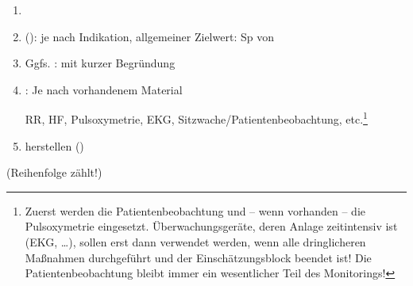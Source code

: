 \label{m:standardmassnahmen-vital}
\label{topic:standardmassnahmen-vital}%
\begin{enumerate}
  \item {}
  \item {}
  (): je nach Indikation,
  allgemeiner Zielwert: Sp von \PC*
  \item Ggfs.  :
  mit kurzer Begründung
  
  \item {}: Je nach
  vorhandenem Material
  
  RR, HF, Pulsoxymetrie, EKG,
  Sitzwache/Patientenbeobachtung, etc.\footnote{Zuerst werden die Patientenbeobachtung
  und -- wenn vorhanden -- die
  Pulsoxymetrie eingesetzt. Überwachungsgeräte, deren Anlage
  zeitintensiv ist (EKG, \ldots), sollen erst dann verwendet
  werden, wenn alle dringlicheren Maßnahmen durchgeführt und
  der Einschätzungsblock beendet ist! Die
  Patientenbeobachtung bleibt immer ein wesentlicher Teil
  des Monitorings!}
  \item {} herstellen
  ()
\end{enumerate}

{\scriptsize(Reihenfolge zählt!)}